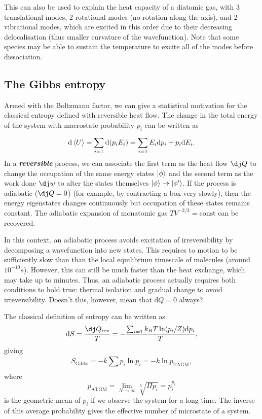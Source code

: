 \documentclass{article}
\theoremstyle{nonumberplain}
\begin{document}
This can also be used to explain the heat capacity of a diatomic gas, with 3 translational modes, 2 rotational modes (no rotation along the axis), and 2 vibrational modes, which are excited in this order due to their decreasing delocalisation (thus smaller curvature of the wavefunction). Note that some species may be able to sustain the temperature to excite all of the modes before dissociation. 

\subsection{The Gibbs entropy}
Armed with the Boltzmann factor, we can give a statistical motivation for the classical entropy defined with reversible heat flow. The change in the total energy of the system with macrostate probability $p_i$ can be written as
\[
    \mathrm{d} \expval{U} = \sum_{i=1}^{} \mathrm{d} (p_i E_i) = \sum_{i=1}^{} E_i \mathrm{d} p_i + p_i \mathrm{d} E_i . 
\]
In a \textit{\textbf{reversible}} process, we can associate the first term as the heat flow $\dj Q$ to change the occupation of the same energy states $\ket{\phi}$ and the second term as the work done $\dj w $ to alter the states themselves $\ket{\phi} \to \ket{\phi^\prime }$. If the process is adiabatic ($\dj Q = 0$) (for example, by contracting a box very slowly), then the energy eigenstates changes continuously but occupation of these states remains constant. The adiabatic expansion of monatomic gas $T V^{-2 /3} = \mathrm{const} $ can be recovered. 

In this context, an adiabatic process avoids excitation of irreversibility by decomposing a wavefunction into new states. This requires to motion to be sufficiently slow than than the local equilibrium timescale of molecules (around $10^{-10} s$). However, this can still be much faster than the heat exchange, which may take up to minutes. Thus, an adiabatic process actually requires both conditions to hold true: thermal isolation and gradual change to avoid irreversibility. Doesn't this, however, mean that $\mathrm{d} Q = 0$ always? 

The classical definition of entropy can be written as
\[
    \mathrm{d} S = \frac{\dj Q_{\mathrm{rev} }}{T} = - \frac{\sum_{i=1}^{} k_B T \ln(p_i / Z) \mathrm{d} p_i}{T},  
\]
giving 
\[
    \boxed{S_{\mathrm{Gibbs} } = -k \sum_{}^{} p_i \ln{p_i} = -k \ln p_{\mathrm{TAGM} } ,}
\]
where 
\[
    p_{\mathrm{ATGM} }  = \lim_{N\to \infty } \sqrt[N]{\Pi p_i} = p_i^{p_i}
\]
is the geometric mean of $p_i$ if we observe the system for a long time. The inverse of this average probability gives the effective number of microstate of a system. 
\end{document}
